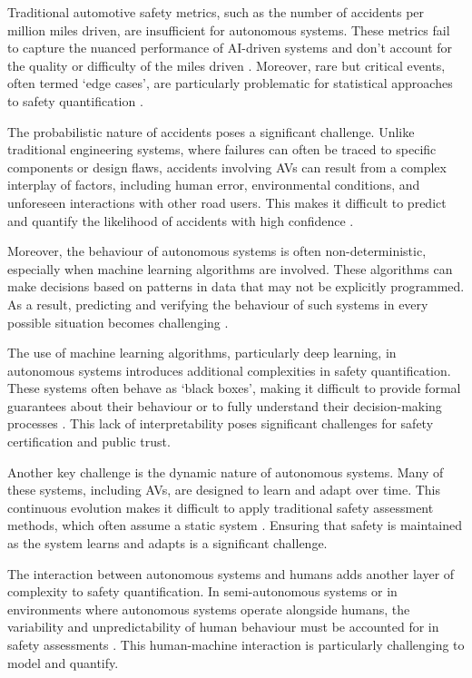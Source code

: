 Traditional automotive safety metrics, such as the number of accidents per million miles driven, are insufficient for autonomous systems. These metrics fail to capture the nuanced performance of AI-driven systems and don't account for the quality or difficulty of the miles driven \cite{Kalra2016}. Moreover, rare but critical events, often termed `edge cases', are particularly problematic for statistical approaches to safety quantification \cite{Koopman2019}.

The probabilistic nature of accidents poses a significant challenge. Unlike traditional engineering systems, where failures can often be traced to specific components or design flaws, accidents involving AVs can result from a complex interplay of factors, including human error, environmental conditions, and unforeseen interactions with other road users. This makes it difficult to predict and quantify the likelihood of accidents with high confidence \cite{Zhao2020}.

Moreover, the behaviour of autonomous systems is often non-deterministic, especially when machine learning algorithms are involved. These algorithms can make decisions based on patterns in data that may not be explicitly programmed. As a result, predicting and verifying the behaviour of such systems in every possible situation becomes challenging \cite{Amodei2016}. %

The use of machine learning algorithms, particularly deep learning, in autonomous systems introduces additional complexities in safety quantification. These systems often behave as `black boxes', making it difficult to provide formal guarantees about their behaviour or to fully understand their decision-making processes \cite{Burton2017}. This lack of interpretability poses significant challenges for safety certification and public trust.

Another key challenge is the dynamic nature of autonomous systems. Many of these systems, including AVs, are designed to learn and adapt over time. This continuous evolution makes it difficult to apply traditional safety assessment methods, which often assume a static system \cite{Salay2019}. Ensuring that safety is maintained as the system learns and adapts is a significant challenge.

The interaction between autonomous systems and humans adds another layer of complexity to safety quantification. In semi-autonomous systems or in environments where autonomous systems operate alongside humans, the variability and unpredictability of human behaviour must be accounted for in safety assessments \cite{Endsley2017}. This human-machine interaction is particularly challenging to model and quantify.

